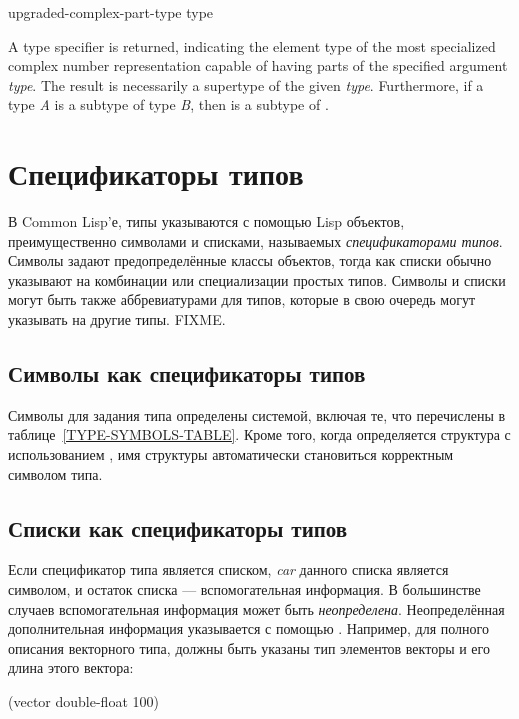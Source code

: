 \begin{new}
\begin{defun}[Function]
upgraded-complex-part-type type

A type specifier is returned, indicating the element type
of the most specialized complex number representation capable of having
parts of the specified argument \emph{type}.
The result is necessarily a supertype of the given \emph{type}.
Furthermore, if a type \emph{A} is a subtype of type \emph{B}, then
 is a subtype of
.
\end{defun}

\end{new}

\else %

\chapter{Спецификаторы типов}    %
\label{DTSPEC}

В Common Lisp'е, типы указываются с помощью Lisp объектов, преимущественно
символами и списками, называемых \emph{спецификаторами типов}. Символы задают
предопределённые классы объектов, тогда как списки обычно указывают на
комбинации или специализации простых типов.
Символы и списки могут быть также аббревиатурами для типов, которые в свою
очередь могут указывать на другие типы. FIXME. 

\section{Символы как спецификаторы типов}

Символы для задания типа определены системой, включая те, что перечислены в
таблице~\ref{TYPE-SYMBOLS-TABLE}.
Кроме того, когда определяется структура с использованием , имя
структуры автоматически становиться корректным символом типа.

\section{Списки как спецификаторы типов}

Если спецификатор типа является списком, \emph{car} данного списка является
символом, и остаток списка --- вспомогательная информация. В большинстве случаев
вспомогательная информация может быть \emph{неопределена}. Неопределённая
дополнительная информация указывается с помощью \cdf{*}. Например, для полного
описания векторного типа, должны быть указаны тип элементов векторы и его длина
этого вектора:
\begin{lisp}
(vector double-float 100)
\end{lisp}

